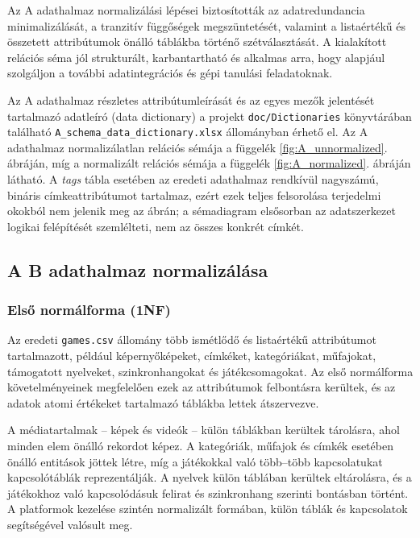 Az A adathalmaz normalizálási lépései biztosították az adatredundancia minimalizálását, a tranzitív függőségek megszüntetését, valamint a listaértékű és összetett attribútumok önálló táblákba történő szétválasztását. A kialakított relációs séma jól strukturált, karbantartható és alkalmas arra, hogy alapjául szolgáljon a további adatintegrációs és gépi tanulási feladatoknak.

Az A adathalmaz részletes attribútumleírását és az egyes mezők jelentését
tartalmazó adatleíró (data dictionary) a projekt \texttt{doc/Dictionaries}
könyvtárában található \texttt{A\_schema\_data\_dictionary.xlsx}
állományban érhető el. Az A adathalmaz normalizálatlan relációs sémája a
függelék \ref{fig:A_unnormalized}. ábráján, míg a normalizált relációs
sémája a függelék \ref{fig:A_normalized}. ábráján látható. A
\textit{tags} tábla esetében az eredeti adathalmaz rendkívül nagyszámú,
bináris címkeattribútumot tartalmaz, ezért ezek teljes felsorolása
terjedelmi okokból nem jelenik meg az ábrán; a sémadiagram elsősorban az
adatszerkezet logikai felépítését szemlélteti, nem az összes konkrét
címkét.

\subsection{A B adathalmaz normalizálása}

\subsubsection{Első normálforma (1NF)}

Az eredeti \texttt{games.csv} állomány több ismétlődő és listaértékű attribútumot tartalmazott, például képernyőképeket, címkéket, kategóriákat, műfajokat, támogatott nyelveket, szinkronhangokat és játékcsomagokat. Az első normálforma követelményeinek megfelelően ezek az attribútumok felbontásra kerültek, és az adatok atomi értékeket tartalmazó táblákba lettek átszervezve.

A médiatartalmak – képek és videók – külön táblákban kerültek tárolásra, ahol minden elem önálló rekordot képez. A kategóriák, műfajok és címkék esetében önálló entitások jöttek létre, míg a játékokkal való több–több kapcsolatukat kapcsolótáblák reprezentálják. A nyelvek külön táblában kerültek eltárolásra, és a játékokhoz való kapcsolódásuk felirat és szinkronhang szerinti bontásban történt. A platformok kezelése szintén normalizált formában, külön táblák és kapcsolatok segítségével valósult meg.

